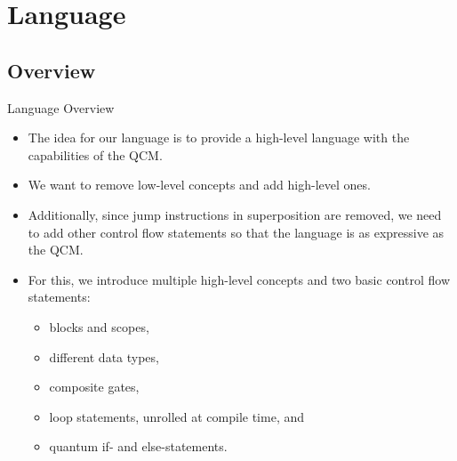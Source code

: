 \section{Language}
\subsection{Overview}
\begin{frame}{Language Overview}
    \begin{itemize}
        \item The idea for our language is to provide a high-level language with the capabilities of the QCM. 
        \item We want to remove low-level concepts and add high-level ones.
        \item Additionally, since jump instructions in superposition are removed, we need to add other control flow statements so that the
        language is as expressive as the QCM.
        \item For this, we introduce multiple high-level concepts and two basic control flow statements:
        \begin{itemize}
            \item blocks and scopes,
            \item different data types,
            \item composite gates,
            \item loop statements, unrolled at compile time, and
            \item quantum if- and else-statements.
        \end{itemize}
    \end{itemize}
\end{frame}

